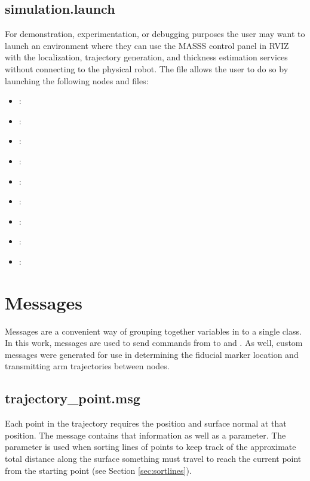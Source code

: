 \subsection{simulation.launch}

For demonstration, experimentation, or debugging purposes the user may want to launch an environment where they can use the MASSS control panel in RVIZ with the localization, trajectory generation, and thickness estimation services without connecting to the physical robot. The  file allows the user to do so by launching the following nodes and files:

\begin{itemize}

\item {} : 
\item {} : 
\item {} : 
\item {} : 
\item {} : 
\item {} : 
\item {} : 
\item {} : 
\item {} : 
\end{itemize}

\section{Messages}

Messages are a convenient way of grouping together variables in to a single class. In this work, messages are used to send commands from  to  and . As well, custom messages were generated for use in determining the fiducial marker location and transmitting arm trajectories between nodes.\\

\subsection{trajectory\_point.msg}
Each point in the trajectory requires the position and surface normal at that position. The  message contains that information as well as a  parameter. The  parameter is used when sorting lines of points to keep track of the approximate total distance along the surface something must travel to reach the current point from the starting point (see Section \ref{sec:sortlines}).\\
